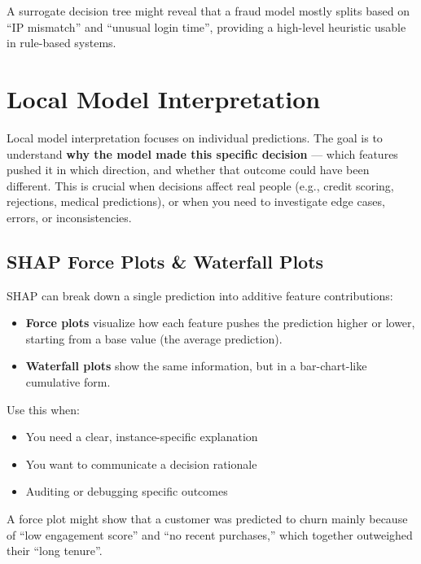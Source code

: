 \documentclass[12pt,openany]{book}
\begin{document}
\begin{examplebox}
A surrogate decision tree might reveal that a fraud model mostly splits based on ``IP mismatch'' and ``unusual login time'', providing a high-level heuristic usable in rule-based systems.
\end{examplebox}




\chapter{Local Model Interpretation}

Local model interpretation focuses on individual predictions. The goal is to understand \textbf{why the model made this specific decision} — which features pushed it in which direction, and whether that outcome could have been different. This is crucial when decisions affect real people (e.g., credit scoring, rejections, medical predictions), or when you need to investigate edge cases, errors, or inconsistencies.



\section{SHAP Force Plots \& Waterfall Plots}

SHAP can break down a single prediction into additive feature contributions:
\begin{itemize}
  \item \textbf{Force plots} visualize how each feature pushes the prediction higher or lower, starting from a base value (the average prediction).
  \item \textbf{Waterfall plots} show the same information, but in a bar-chart-like cumulative form.
\end{itemize}

Use this when:
\begin{itemize}
  \item You need a clear, instance-specific explanation
  \item You want to communicate a decision rationale
  \item Auditing or debugging specific outcomes
\end{itemize}

\begin{examplebox}
A force plot might show that a customer was predicted to churn mainly because of ``low engagement score'' and ``no recent purchases,'' which together outweighed their ``long tenure''.
\end{examplebox}
\end{document}
